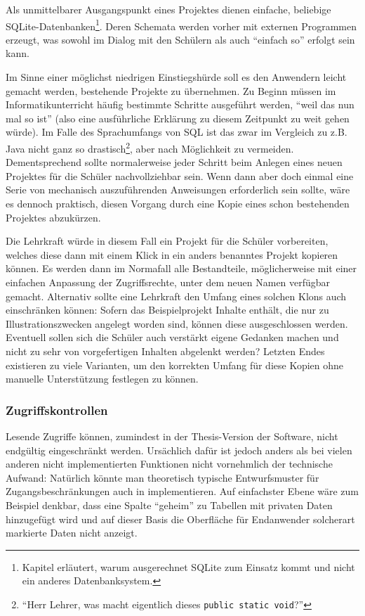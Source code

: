 Als unmittelbarer Ausgangspunkt eines Projektes dienen einfache, beliebige SQLite-Datenbanken\footnote{Kapitel  erläutert, warum ausgerechnet SQLite zum Einsatz kommt und nicht ein anderes Datenbanksystem.}. Deren Schemata werden vorher mit externen Programmen erzeugt, was sowohl im Dialog mit den Schülern als auch "`einfach so"' erfolgt sein kann.

Im Sinne einer möglichst niedrigen Einstiegshürde soll es den Anwendern leicht gemacht werden, bestehende Projekte zu übernehmen. Zu Beginn müssen im Informatikunterricht häufig bestimmte Schritte ausgeführt werden, "`weil das nun mal so ist"' (also eine ausführliche Erklärung zu diesem Zeitpunkt zu weit gehen würde). Im Falle des Sprach\-umfangs von SQL ist das zwar im Vergleich zu z.B. Java nicht ganz so drastisch\footnote{"`Herr Lehrer, was macht eigentlich dieses \texttt{public static void}?"'}, aber nach Möglichkeit zu vermeiden. Dementsprechend sollte normalerweise jeder Schritt beim Anlegen eines neuen Projektes für die Schüler nachvollziehbar sein. Wenn dann aber doch einmal eine Serie von mechanisch auszuführenden Anweisungen erforderlich sein sollte, wäre es dennoch praktisch, diesen Vorgang durch eine Kopie eines schon bestehenden Projektes abzukürzen.

Die Lehrkraft würde in diesem Fall ein Projekt für die Schüler vorbereiten, welches diese dann mit einem Klick in ein anders benanntes Projekt kopieren können. Es werden dann im Normafall alle Bestandteile, möglicherweise mit einer einfachen Anpassung der Zugriffsrechte, unter dem neuen Namen verfügbar gemacht. Alternativ sollte eine Lehrkraft den Umfang eines solchen Klons auch einschränken können: Sofern das Beispielprojekt Inhalte enthält, die nur zu Illustrationszwecken angelegt worden sind, können diese ausgeschlossen werden. Eventuell sollen sich die Schüler auch verstärkt eigene Gedanken machen und nicht zu sehr von vorgefertigen Inhalten abgelenkt werden? Letzten Endes existieren zu viele Varianten, um den korrekten Umfang für diese Kopien ohne manuelle Unterstützung festlegen zu können.

\subsubsection{Zugriffskontrollen}
\label{sec:concept-access-control}

Lesende Zugriffe können, zumindest in der Thesis-Version der Software, nicht endgültig eingeschränkt werden. Ursächlich dafür ist jedoch anders als bei vielen anderen nicht implementierten Funktionen nicht vornehmlich der technische Aufwand: Natürlich könnte man theoretisch typische Entwurfsmuster für Zugangsbeschränkungen auch in \idename{} implementieren. Auf einfachster Ebene wäre zum Beispiel denkbar, dass eine Spalte "`geheim"' zu Tabellen mit privaten Daten hinzugefügt wird und auf dieser Basis die Oberfläche für Endanwender solcherart markierte Daten nicht anzeigt.

